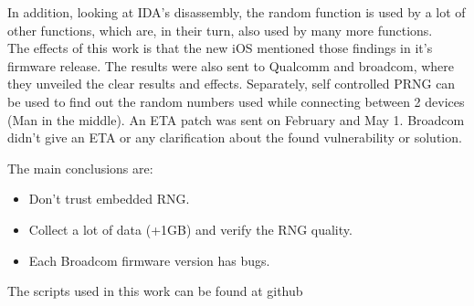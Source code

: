    In addition, looking at IDA’s disassembly, the random function is used by a lot of other functions, which are, in their turn, also used by many more functions.
    \\
    The effects of this work is that the new iOS mentioned those findings in it’s firmware release.
    The results were also sent to Qualcomm and broadcom, where they unveiled the clear results and effects.
    Separately, self controlled PRNG can be used to find out the random numbers used while connecting between 2 devices (Man in the middle).
    An ETA patch was sent on February and May 1.
    Broadcom didn’t give an ETA or any clarification about the found vulnerability or solution.
    
    The main conclusions are:
    \begin{itemize}
    \item Don’t trust embedded RNG.
    \item Collect a lot of data (+1GB) and verify the RNG quality.
    \item Each Broadcom firmware version has bugs.
    \end{itemize}
    The scripts used in this work can be found at \href{https://github.com/seemoo-lab/InternalBlue} github  
